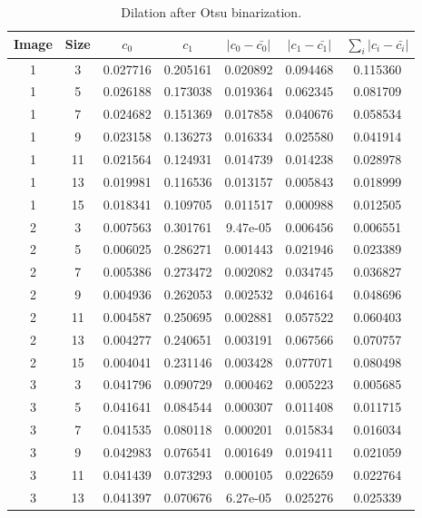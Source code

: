 \begin{longtable}{|c|c|c|c|c|c|c|}
	\caption{Dilation after Otsu binarization.} \label{tab:dilateotsu}\\
	\hline 
	Image & Size & $c_0$ & $c_1$ & $|c_0-\bar{c_0}|$ & $|c_1-\bar{c_1}|$ & $\sum_i |c_i-\bar{c_i}|$ \\ 
	\hline 1 &	3 &	0.027716 &	0.205161 &	0.020892 &	0.094468 &	0.115360 \\
	\hline 1 &	5 &	0.026188 &	0.173038 &	0.019364 &	0.062345 &	0.081709 \\
	\hline 1 &	7 &	0.024682 &	0.151369 &	0.017858 &	0.040676 &	0.058534 \\
	\hline 1 &	9 &	0.023158 &	0.136273 &	0.016334 &	0.025580 &	0.041914 \\
	\hline 1 &	11 &	0.021564 &	0.124931 &	0.014739 &	0.014238 &	0.028978 \\
	\hline 1 &	13 &	0.019981 &	0.116536 &	0.013157 &	0.005843 &	0.018999 \\
	\hline \rowcolor{closest} 1 &	15 &	0.018341 &	0.109705 &	0.011517 &	0.000988 &	0.012505 \\
	\hline \rowcolor{closest} 2 &	3 &	0.007563 &	0.301761 &	9.47e-05 &	0.006456 &	0.006551 \\
	\hline 2 &	5 &	0.006025 &	0.286271 &	0.001443 &	0.021946 &	0.023389 \\
	\hline 2 &	7 &	0.005386 &	0.273472 &	0.002082 &	0.034745 &	0.036827 \\
	\hline 2 &	9 &	0.004936 &	0.262053 &	0.002532 &	0.046164 &	0.048696 \\
	\hline 2 &	11 &	0.004587 &	0.250695 &	0.002881 &	0.057522 &	0.060403 \\
	\hline 2 &	13 &	0.004277 &	0.240651 &	0.003191 &	0.067566 &	0.070757 \\
	\hline 2 &	15 &	0.004041 &	0.231146 &	0.003428 &	0.077071 &	0.080498 \\
	\hline \rowcolor{closest} 3 &	3 &	0.041796 &	0.090729 &	0.000462 &	0.005223 &	0.005685 \\
	\hline 3 &	5 &	0.041641 &	0.084544 &	0.000307 &	0.011408 &	0.011715 \\
	\hline 3 &	7 &	0.041535 &	0.080118 &	0.000201 &	0.015834 &	0.016034 \\
	\hline 3 &	9 &	0.042983 &	0.076541 &	0.001649 &	0.019411 &	0.021059 \\
	\hline 3 &	11 &	0.041439 &	0.073293 &	0.000105 &	0.022659 &	0.022764 \\
	\hline 3 &	13 &	0.041397 &	0.070676 &	6.27e-05 &	0.025276 &	0.025339 \\

\end{longtable}
